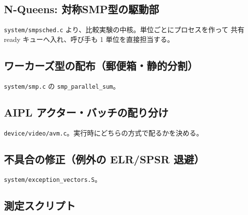 \documentclass[a4paper,11pt]{ltjsarticle}
\begin{document}
\subsection{N-Queens: 対称SMP型の駆動部}
\texttt{system/smpsched.c} より、比較実験の中核。単位ごとにプロセスを作って
共有 ready キューへ入れ、呼び手も 1 単位を直接担当する。



\subsection{ワーカーズ型の配布（郵便箱・静的分割）}
\texttt{system/smp.c} の \texttt{smp\_parallel\_sum}。



\subsection{AIPL アクター・バッチの配り分け}
\texttt{device/video/avm.c}。実行時にどちらの方式で配るかを決める。



\subsection{不具合の修正（例外の ELR/SPSR 退避）}
\texttt{system/exception\_vectors.S}。



\subsection{測定スクリプト}

\end{document}
